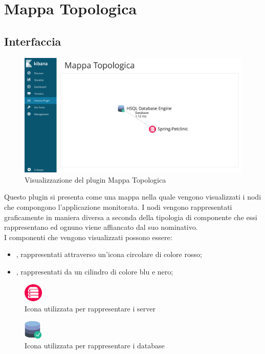 \newpage
\section{Mappa Topologica}
\label{sec:mtopologica}
\subsection{Interfaccia}

\begin{figure}[H]
	\centering 
	\includegraphics[width=1\textwidth]{Images/mappa}
	\caption{Visualizzazione del plugin Mappa Topologica}
\end{figure}

Questo plugin si presenta come una mappa nella quale vengono visualizzati i nodi  che compongono l'applicazione monitorata.
I nodi vengono rappresentati graficamente in maniera diversa a seconda della tipologia di componente che essi rappresentano ed ognuno viene affiancato dal suo nominativo.
\\ I componenti che vengono visualizzati possono essere:
\begin{itemize}
	\item \emph{}, rappresentati attraverso un'icona circolare di colore rosso;
	\item \emph{}, rappresentati da un cilindro di colore blu e nero;
\end{itemize}
\begin{figure}[H]
	\centering 
	\includegraphics[width=0.08\textwidth]{Images/server.png}
	\caption{Icona utilizzata per rappresentare i server}
	\label{server} 
\end{figure}
\begin{figure}[H]
	\centering 
	\includegraphics[width=0.08\textwidth]{Images/database.png}
	\caption{Icona utilizzata per rappresentare i database}
	\label{database} 
\end{figure}

